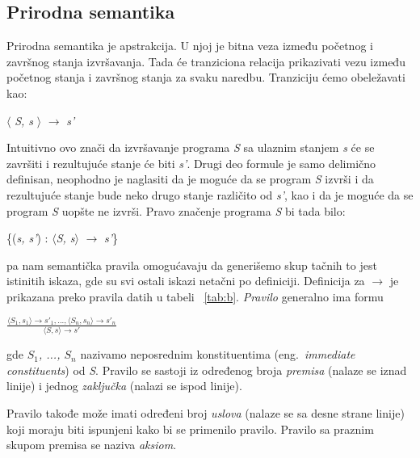 \documentclass[a4paper]{article}
\begin{document}
{\subsection{Prirodna semantika}

\qquad Prirodna semantika je apstrakcija. U njoj je bitna veza između početnog i završnog stanja izvršavanja. Tada će tranziciona relacija prikazivati vezu između početnog stanja i završnog stanja za svaku naredbu. Tranziciju ćemo obeležavati kao:

\begin{center}$\langle$ \textit{S, s} $\rangle$ $\rightarrow$ \textit{s'} \end{center}
Intuitivno ovo znači da izvršavanje programa \textit{S} sa ulaznim stanjem \textit{s} će se završiti i rezultujuće stanje će biti \textit{s'}. Drugi deo formule je samo delimično definisan, neophodno je naglasiti da je moguće da se program \textit{S} izvrši i da rezultujuće stanje bude neko drugo stanje različito od \textit{s'}, kao i da je moguće da se program \textit{S} uopšte ne izvrši. Pravo značenje programa \textit{S} bi tada bilo:
\begin{center}\{(\textit{s, s'}) : $\langle$\textit{S, s}$\rangle$ $\rightarrow$ \textit{s'}\} \end{center} 
pa nam semantička pravila omogućavaju da generišemo skup tačnih to jest istinitih iskaza, gde su svi ostali iskazi netačni po definiciji.\cite{opersem}
Definicija za $\rightarrow$ je prikazana preko pravila datih u tabeli ~\ref{tab:b}. \textit{Pravilo} generalno ima formu

{\large \begin{center}$\frac{\langle S_1, s_1 \rangle \rightarrow s'_1, ... , \langle S_n, s_n \rangle \rightarrow s'_n}{\langle S, s \rangle \rightarrow s'}$ \end{center}}

gde \textit{$S_1$, ..., $S_n$} nazivamo neposrednim konstituentima (eng.~{\em immediate constituents}) od \textit{S}. Pravilo se sastoji iz određenog broja \textit{premisa} (nalaze se iznad linije) i jednog \textit{zaključka} (nalazi se ispod linije).

Pravilo takođe može imati određeni broj \textit{uslova} (nalaze se sa desne strane linije) koji moraju biti ispunjeni kako bi se primenilo pravilo. Pravilo sa praznim skupom premisa se naziva \textit{aksiom}. \cite{willey}

}
\end{document}
